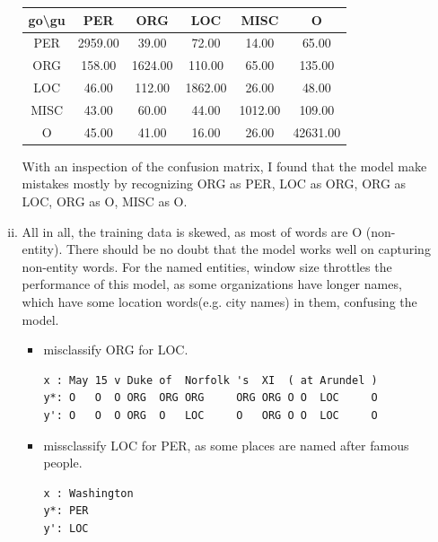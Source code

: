 \documentclass{article}[11pt]
\begin{document}
\begin{enumerate}[(a)]
\begin{enumerate}[i.]
\begin{table}[H]
\begin{tabular}{|c|c|c|c|c|c|}
        go\textbackslash gu & PER     & ORG     & LOC     & MISC    & O        \\ \hline
        PER   & 2959.00 & 39.00   & 72.00   & 14.00   & 65.00    \\ \hline
        ORG   & 158.00  & 1624.00 & 110.00  & 65.00   & 135.00   \\ \hline
        LOC   & 46.00   & 112.00  & 1862.00 & 26.00   & 48.00    \\ \hline
        MISC  & 43.00   & 60.00   & 44.00   & 1012.00 & 109.00   \\ \hline
        O     & 45.00   & 41.00   & 16.00   & 26.00   & 42631.00 \\ \hline
      \end{tabular}
    \end{table}
    With an inspection of the confusion matrix, I found that the model make
    mistakes mostly by recognizing ORG as PER, LOC as ORG, ORG as LOC, ORG as O,
    MISC as O.
  \item All in all, the training data is skewed, as most of words are O
    (non-entity). There should be no doubt that the model works well on
    capturing non-entity words. For the named entities, window size throttles
    the performance of this model, as some organizations have longer names,
    which have some location words(e.g. city names) in them, confusing the
    model.
    \begin{itemize}
    \item misclassify ORG for LOC.
\begin{verbatim}
x : May 15 v Duke of  Norfolk 's  XI  ( at Arundel ) 
y*: O   O  O ORG  ORG ORG     ORG ORG O O  LOC     O 
y': O   O  O ORG  O   LOC     O   ORG O O  LOC     O 
\end{verbatim}
    \item missclassify LOC for PER, as some places are named after famous
      people.
\begin{verbatim}
x : Washington
y*: PER
y': LOC
\end{verbatim}
    \end{itemize}
  \end{enumerate}
\end{enumerate}
\end{document}
